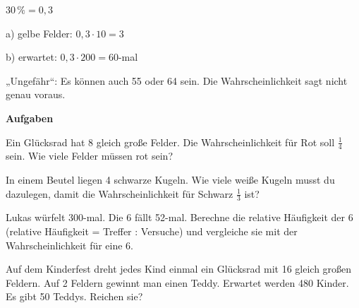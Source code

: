 \documentclass[11pt]{article}
\newcommand{\aufg}[3]{\par\noindent\makebox[0pt][r]{#3}\begin{minipage}[t]{\linewidth}#1\end{minipage}\par}
\newcommand{\nr}[1]{\makebox[7mm][l]{\textbf{#1}}}
\newlength{\kr}
\begin{document}
\noindent\par\noindent{}$30\,\% = 0{,}3$\par\smallskip\par\noindent{}a) gelbe Felder: $0{,}3 \cdot 10 = 3$\par\smallskip\par\noindent{}b) erwartet: $0{,}3 \cdot 200 = 60$-mal\par\smallskip\par\noindent{}„Ungefähr“: Es können auch 55 oder 64 sein. Die Wahrscheinlichkeit sagt nicht genau voraus.\par\smallskip\par\medskip
\noindent\textbf{Aufgaben}\par\smallskip
\aufg{\nr{1.}Ein Glücksrad hat 8 gleich große Felder. Die Wahrscheinlichkeit für Rot soll $\frac{1}{4}$ sein. Wie viele Felder müssen rot sein?}{}{}
\medskip
\aufg{\nr{2.}In einem Beutel liegen 4 schwarze Kugeln. Wie viele weiße Kugeln musst du dazulegen, damit die Wahrscheinlichkeit für Schwarz $\frac{1}{3}$ ist?}{}{}
\medskip
\aufg{\nr{3.}Lukas würfelt 300-mal. Die 6 fällt 52-mal. Berechne die relative Häufigkeit der 6 (relative Häufigkeit = Treffer : Versuche) und vergleiche sie mit der Wahrscheinlichkeit für eine 6.}{}{}
\medskip
\aufg{\nr{4.}Auf dem Kinderfest dreht jedes Kind einmal ein Glücksrad mit 16 gleich großen Feldern. Auf 2 Feldern gewinnt man einen Teddy. Erwartet werden 480 Kinder. Es gibt 50 Teddys. Reichen sie?}{}{{\scriptsize\color{mbgrau}Ziel\hspace{2mm}}}
\medskip
\par\vspace{3mm}\setlength{\kr}{\dimexpr\pagegoal-\pagetotal-10mm\relax}%
\ifdim\kr>12mm\noindent{\scriptsize\color{mbgrau}Platz zum Rechnen}\par\nointerlineskip\vspace{1mm}\noindent
\begin{tikzpicture}\clip (0,0) rectangle ({\linewidth-0.5mm},\kr);\draw[black!16,line width=0.3pt,step=5mm] (0,0) grid (\linewidth,\kr);\end{tikzpicture}\fi\par
\end{document}
